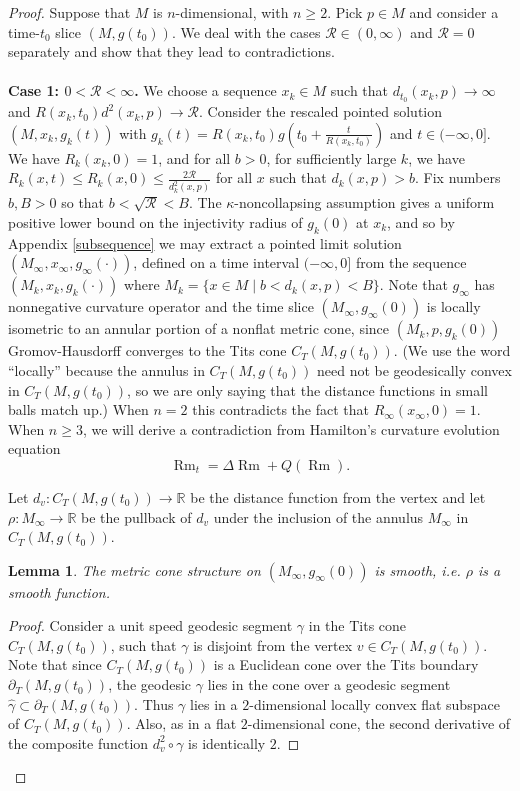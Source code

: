 \documentclass[12pt]{amsart}
\newcommand{\R}{{\mathbb R}}
\newcommand{\Rm}{\operatorname{Rm}}
\newcommand{\ctits}{C_T}
\newcommand{\ga}{\gamma}
\newcommand{\ra}{\rightarrow}
\newcommand{\tits}{\partial_T}
\numberwithin{equation}{section}
\theoremstyle{plain}
\newtheorem{lemma}[equation]{Lemma}
\theoremstyle{definition}
\theoremstyle{remark}
\begin{document}
\begin{proof}
Suppose that $M$ is $n$-dimensional,
with $n\geq 2$.   Pick $p\in M$ and consider a time-$t_0$
slice $(M,g(t_0))$.  
We deal with the cases ${\mathcal R} \in (0, \infty)$ and
${\mathcal R} = 0$ separately and show that they lead to contradictions. \\ \\
{\bf Case 1: $0<{\mathcal R}<\infty$.}  We choose a sequence 
$x_k\in M$ such that $d_{t_0}(x_k,p)\ra \infty$ and 
$R(x_k,t_0)d^2(x_k,p)\ra{\mathcal R}$.
Consider the rescaled pointed solution
$(M,x_k,g_k(t))$ with
$g_k(t) =R(x_k,t_0)g(t_0 + \frac{t}{R(x_k,t_0)})$ and $t\in (-\infty,0]$.
We have $R_k(x_k,0)=1$, and for all $b>0$, for sufficiently large $k$,
we have $R_k(x,t)\leq R_k(x,0)\leq \frac{2{\mathcal R}}{d_k^2(x,p)}$
for all $x$ such that $d_k(x,p)>b$.  
Fix numbers $b, B > 0$ so that  $b<\sqrt{{\mathcal R}}<B$.
The $\kappa$-noncollapsing assumption gives a uniform positive
lower bound on the
injectivity radius of $g_k(0)$ at $x_k$,
and so by Appendix \ref{subsequence}
we may extract a pointed limit solution 
$(M_\infty,x_\infty,g_\infty(\cdot))$, defined on a time interval
$(-\infty,0]$ from the sequence
$(M_k,x_k,g_k(\cdot))$ where $M_k =\{x\in M\mid b<d_k(x,p)<B\}$.
Note that $g_\infty$ has nonnegative curvature operator and 
the time slice $(M_\infty,g_\infty(0))$ is locally
isometric to an annular
portion of a nonflat metric cone, since $(M_k,p,g_k(0))$
Gromov-Hausdorff converges to the Tits cone $\ctits(M,g(t_0))$.
(We use the word ``locally'' because the annulus in $\ctits(M,g(t_0))$
need not be geodesically convex in $\ctits(M,g(t_0))$, so we are only 
saying that the distance functions in small balls match up.)
When $n=2$ this contradicts the fact that $R_\infty(x_\infty,0)=1$.
When $n\geq 3$, we will derive a contradiction from 
Hamilton's curvature evolution equation
\begin{equation}
\label{curvevol}
\Rm_t=\Delta \Rm+Q(\Rm).
\end{equation}  

Let $d_v : \ctits(M,g(t_0)) \rightarrow \R$ be the distance function
from the vertex and let 
$\rho:M_\infty\ra \R$ be the pullback of $d_v$ under the inclusion of
the annulus $M_\infty$ in $\ctits(M,g(t_0))$.

\begin{lemma}
The metric cone structure on $(M_\infty,g_\infty(0))$  is
smooth, i.e. $\rho$ is a smooth function.
\end{lemma}
\begin{proof}
Consider a unit speed geodesic segment $\ga$ in the Tits cone 
$\ctits(M,g(t_0))$,
such that $\ga$ is disjoint from the vertex $v\in \ctits(M,g(t_0))$.
Note that since $\ctits(M,g(t_0))$ is a Euclidean cone over
the Tits boundary $\tits (M,g(t_0))$, the
geodesic $\ga$ lies in the cone over a geodesic segment
$\hat\ga\subset\tits (M,g(t_0))$.
Thus $\ga$ lies in a 
$2$-dimensional
locally convex flat subspace of $\ctits(M,g(t_0))$.
Also, as in a flat $2$-dimensional cone,
the second derivative of the composite function 
$d_v^2\circ\ga$ is identically $2$. 


\end{proof}
\end{proof}
\end{document}

